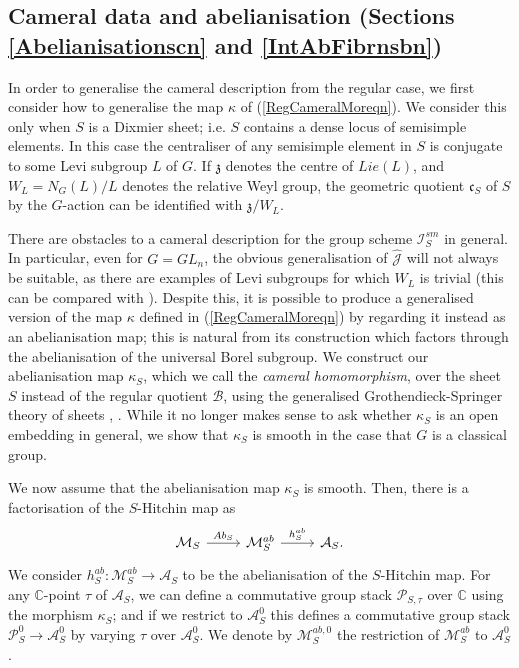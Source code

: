 \documentclass{amsart}
\theoremstyle{remark}
\numberwithin{theorem}{section}
\numberwithin{equation}{section}
\begin{document}
\subsection*{Cameral data and abelianisation (Sections \ref{Abelianisationscn} and \ref{IntAbFibrnsbn})}
In order to generalise the cameral description from the regular case, we first consider how to generalise the map $\kappa$ of (\ref{RegCameralMoreqn}). We consider this only when $S$ is a Dixmier sheet; i.e. $S$ contains a dense locus of semisimple elements. In this case the centraliser of any semisimple element in $S$ is conjugate to some Levi subgroup $L$ of $G$. If $\mathfrak{z}$ denotes the centre of $Lie(L)$, and $W_L = N_G(L)/L$ denotes the relative Weyl group, the geometric quotient $\mathfrak{c}_S$ of $S$ by the $G$-action can be identified with $\mathfrak{z}/W_L$.

There are obstacles to a cameral description for the group scheme $\mathcal I^{sm}_S$ in general. In particular, even for $G = GL_n$, the obvious generalisation of $\hat{\mathcal J}$ will not always be suitable, as there are examples of Levi subgroups for which $W_L$ is trivial (this can be compared with \cite[Example 4.2]{HM}). Despite this, it is possible to produce a generalised version of the map $\kappa$ defined in (\ref{RegCameralMoreqn}) by regarding it instead as an abelianisation map; this is natural from its construction which factors through the abelianisation of the universal Borel subgroup. We construct our abelianisation map $\kappa_S$, which we call the \emph{cameral homomorphism}, over the sheet $S$ instead of the regular quotient $\mathcal B$, using the generalised Grothendieck-Springer theory of sheets \cite{BB}, \cite{Broer1}. While it no longer makes sense to ask whether $\kappa_S$ is an open embedding in general, we show that $\kappa_S$ is smooth in the case that $G$ is a classical group.

We now assume that the abelianisation map $\kappa_S$ is smooth. Then, there is a factorisation of the $S$-Hitchin map as
\begin{equation}
    \begin{tikzcd}
        \mathcal M_S \arrow[r, "Ab_S"] & \mathcal M^{ab}_S \arrow[r, "h_S^{ab}"] & \mathcal A_S.
    \end{tikzcd} 
\end{equation}
We consider $h_S^{ab}:\mathcal M_S^{ab}\rightarrow \mathcal A_S$ to be the abelianisation of the $S$-Hitchin map. For any $\mathbb{C}$-point $\tau$ of $\mathcal A_S$, we can define a commutative group stack $\mathcal P_{S,\tau}$ over $\mathbb{C}$ using the morphism $\kappa_S$; and if we restrict to $\mathcal A_S^0$ this defines a commutative group stack $\mathcal P_S^0 \rightarrow \mathcal A_S^0$ by varying $\tau$ over $\mathcal A_S^0$. We denote by $\mathcal M_S^{ab,0}$ the restriction of $\mathcal M_S^{ab}$ to $\mathcal A_S^0$.
\end{document}
